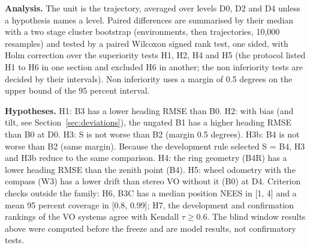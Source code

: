 \textbf{Analysis.} The unit is the trajectory, averaged over levels D0, D2 and D4 unless a hypothesis names a level. Paired differences are summarised by their median with a two stage cluster bootstrap (environments, then trajectories, 10,000 resamples) and tested by a paired Wilcoxon signed rank test, one sided, with Holm correction over the superiority tests H1, H2, H4 and H5 (the protocol listed H1 to H6 in one section and excluded H6 in another; the non inferiority tests are decided by their intervals). Non inferiority uses a margin of 0.5 degrees on the upper bound of the 95 percent interval.

\textbf{Hypotheses.} H1: B3 has a lower heading RMSE than B0. H2: with bias (and tilt, see Section~\ref{sec:deviations}), the ungated B1 has a higher heading RMSE than B0 at D0. H3: S is not worse than B2 (margin 0.5 degrees). H3b: B4 is not worse than B2 (same margin). Because the development rule selected S = B4, H3 and H3b reduce to the same comparison. H4: the ring geometry (B4R) has a lower heading RMSE than the zenith point (B4). H5: wheel odometry with the compass (W3) has a lower drift than stereo VO without it (B0) at D4. Criterion checks outside the family: H6, B3C has a median position NEES in [1, 4] and a mean 95 percent coverage in [0.8, 0.99]; H7, the development and confirmation rankings of the VO systems agree with Kendall $\tau \ge 0.6$. The blind window results above were computed before the freeze and are model results, not confirmatory tests.
